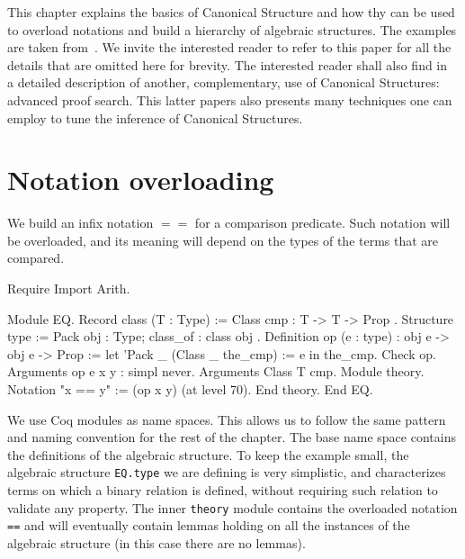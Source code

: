 
\label{CS-full}

\noindent This chapter explains the basics of Canonical Structure and how thy can be used
to overload notations and build a hierarchy of algebraic structures.
The examples are taken from~\cite{CSwcu}.  We invite the interested reader
to refer to this paper for all the details that are omitted here for brevity.
The interested reader shall also find in~\cite{CSlessadhoc} a detailed
description of another, complementary, use of Canonical Structures:
advanced proof search.  This latter papers also presents many techniques one
can employ to tune the inference of Canonical Structures.

\section{Notation overloading}

We build an infix notation $==$ for a comparison predicate.  Such notation
will be overloaded, and its meaning will depend on the types of the terms
that are compared.

\begin{coq_eval}
Require Import Arith.
\end{coq_eval}

\begin{coq_example}
Module EQ.
  Record class (T : Type) := Class { cmp : T -> T -> Prop }.
  Structure type := Pack { obj : Type; class_of : class obj }.
  Definition op (e : type) : obj e -> obj e -> Prop :=
    let 'Pack _ (Class _ the_cmp) := e in the_cmp.
  Check op.
  Arguments op {e} x y : simpl never.
  Arguments Class {T} cmp.
  Module theory.
    Notation "x == y" := (op x y) (at level 70).
  End theory.
End EQ.
\end{coq_example}

We use Coq modules as name spaces.  This allows us to follow the same pattern
and naming convention for the rest of the chapter.  The base name space
contains the definitions of the algebraic structure.  To keep the example
small, the algebraic structure \texttt{EQ.type} we are defining is very simplistic,
and characterizes terms on which a binary relation is defined, without
requiring such relation to validate any property.
The inner \texttt{theory} module contains the overloaded notation \texttt{==} and
will eventually contain lemmas holding on all the instances of the
algebraic structure (in this case there are no lemmas).

